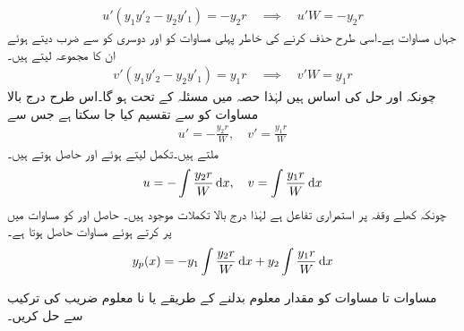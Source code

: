\begin{align*}
u'(y_1y'_2-y_2y'_1)=-y_2r\quad \implies \quad u'W=-y_2r
\end{align*}
جہاں  مساوات   ہے۔اسی طرح  حذف کرنے کی خاطر  پہلی مساوات کو  اور دوسری کو  سے ضرب دیتے ہوئے ان کا مجموعہ لیتے ہیں۔
\begin{align*}
v'(y_1y'_2-y_2y'_1)=y_1r\quad \implies \quad v'W=y_1r
\end{align*}
چونکہ  اور  حل کی اساس ہیں لہٰذا حصہ  میں مسئلہ  کے تحت  ہو گا۔اس طرح درج بالا مساوات کو  سے تقسیم کیا جا سکتا ہے جس سے
\begin{align*}
u'=-\frac{y_2r}{W}, \quad v'=\frac{y_1r}{W}
\end{align*}
ملتے ہیں۔تکمل لیتے ہوئے  اور  حاصل ہوتے ہیں۔
\begin{align*}
u=-\int \frac{y_2r}{W} \dif x, \quad v=\int \frac{y_1r}{W} \dif x
\end{align*}
چونکہ کھلے وقفہ  پر  استمراری تفاعل ہے لہٰذا درج بالا تکملات موجود ہیں۔ حاصل  اور  کو مساوات  میں پر کرتے ہوئے مساوات  حاصل ہوتا ہے۔
\begin{align*}
y_p(x)=-y_1\int \frac{y_2r}{W} \dif x+y_2\int \frac{y_1r}{W} \dif x
\end{align*}

مساوات  تا مساوات  کو مقدار معلوم بدلنے کے طریقے یا نا معلوم  ضریب  کی ترکیب سے حل کریں۔

